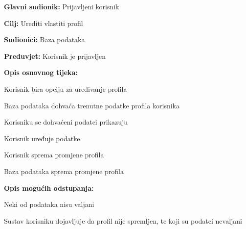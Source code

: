 \noindent {}
\begin{packed_item}

\item \textbf{Glavni sudionik:} Prijavljeni korisnik
\item  \textbf{Cilj:} Urediti vlastiti profil
\item  \textbf{Sudionici:} Baza podataka
\item  \textbf{Preduvjet:} Korisnik je prijavljen
\item  \textbf{Opis osnovnog tijeka:}

\item[] \begin{packed_enum}

    \item Korisnik bira opciju za uređivanje profila
    \item Baza podataka dohvaća trenutne podatke profila korisnika
    \item Korisniku se dohvaćeni podatci prikazuju
    \item Korisnik uređuje podatke
    \item Korisnik sprema promjene profila
    \item Baza podataka sprema promjene profila

\end{packed_enum}

\item  \textbf{Opis mogućih odstupanja:}

\item[] \begin{packed_item}

    \item[6.a] Neki od podataka nisu valjani
    \item[] \begin{packed_enum}

        \item Sustav korisniku dojavljuje da profil nije spremljen, te koji su podatci nevaljani

    \end{packed_enum}

\end{packed_item}
\end{packed_item}

